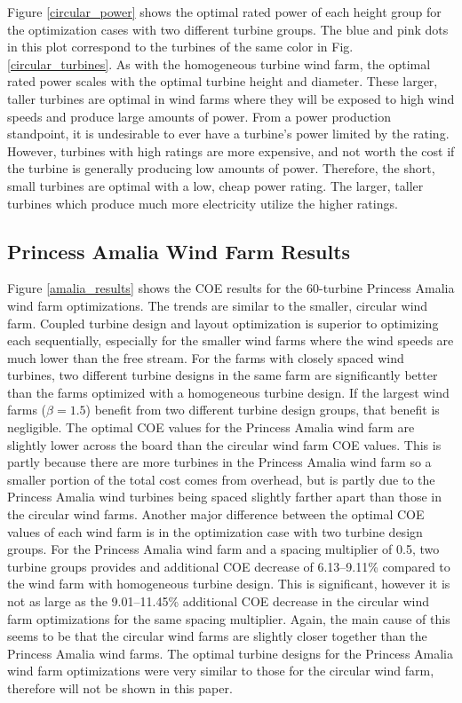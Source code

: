 Figure \ref{circular_power} shows the optimal rated power of each height group for the optimization cases with two different turbine groups. The blue and pink dots in this plot correspond to the turbines of the same color in Fig. \ref{circular_turbines}. As with the homogeneous turbine wind farm, the optimal rated power scales with the optimal turbine height and diameter. These larger, taller turbines are optimal in wind farms where they will be exposed to high wind speeds and produce large amounts of power. From a power production standpoint, it is undesirable to ever have a turbine's power limited by the rating. However, turbines with high ratings are more expensive, and not worth the cost if the turbine is generally producing low amounts of power. Therefore, the short, small turbines are optimal with a low, cheap power rating. The larger, taller turbines which produce much more electricity utilize the higher ratings.





\subsection{Princess Amalia Wind Farm Results}

Figure \ref{amalia_results} shows the COE results for the 60-turbine Princess Amalia wind farm optimizations.  The trends are similar to the smaller, circular wind farm. Coupled turbine design and layout optimization is superior to optimizing each sequentially, especially for the smaller wind farms where the wind speeds are much lower than the free stream. For the farms with closely spaced wind turbines, two different turbine designs in the same farm are significantly better than the farms optimized with a homogeneous turbine design. If the largest wind farms ($\beta=1.5$) benefit from two different turbine design groups, that benefit is negligible. The optimal COE values for the Princess Amalia wind farm are slightly lower across the board than the circular wind farm COE values. This is partly because there are more turbines in the Princess Amalia wind farm so a smaller portion of the total cost comes from overhead, but is partly due to the Princess Amalia wind turbines being spaced slightly farther apart than those in the circular wind farms. Another major difference between the optimal COE values of each wind farm is in the optimization case with two turbine design groups. For the Princess Amalia wind farm and a spacing multiplier of 0.5, two turbine groups provides and additional COE decrease of 6.13--9.11\% compared to the wind farm with homogeneous turbine design. This is significant, however it is not as large as the 9.01--11.45\% additional COE decrease in the circular wind farm optimizations for the same spacing multiplier. Again, the main cause of this seems to be that the circular wind farms are slightly closer together than the Princess Amalia wind farms.
The optimal turbine designs for the Princess Amalia wind farm optimizations were very similar to those for the circular wind farm, therefore will not be shown in this paper.




